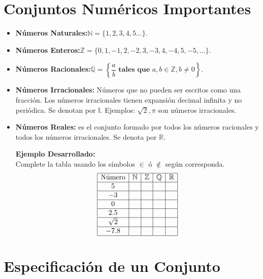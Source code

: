 \documentclass[12pt]{article}
\begin{document}
\section{Conjuntos Numéricos Importantes}
\begin{itemize}
    \item \textbf{Números Naturales:}\quad $\mathbb{N} = \{1, 2, 3,4, 5 ...\}$.
    \item \textbf{Números Enteros:}\quad$\mathbb{Z} = \big\{0, 1, -1, 2, -2, 3, -3, 4, -4, 5, -5, ...\big\}$.
    \item \textbf{Números Racionales:}\quad $\mathbb{Q} = \left\{\dfrac{a}{b} \textbf{ tales que } a, b\in \mathbb{Z}, b\neq 0\right\}$.
    \item \textbf{Números Irracionales:} Números que no pueden ser escritos como una fracción. Los números irracionales tienen expansión decimal infinita y no periódica. Se denotan por $\mathbb{I}$. Ejemplos: $\sqrt{2}, \pi$ son números irracionales.
    \item \textbf{Números Reales:} es el conjunto formado por todos los números racionales y todos los números irracionales. Se denota por $\mathbb{R}$.

\textbf{Ejemplo Desarrollado:}\\
    Complete la tabla usando los símbolos $\in$ ó $\notin$ según corresponda.
    \[
\begin{array}{|c|c|c|c|c|}
\hline
\text{Número} & \mathbb{N} & \mathbb{Z} &\mathbb{Q} & \mathbb{R} \\
\hline
5      &               &               &         &      \\
\hline
-3     &               &               &         &      \\
\hline
0      &               &               &         &      \\
\hline
2.5    &               &               &         &      \\
\hline
\sqrt{2} &             &               &          &     \\
\hline
-7.8   &               &               &          &     \\
\hline
\end{array}
\]

\end{itemize}
 
\section{Especificación de un Conjunto}
\end{document}
